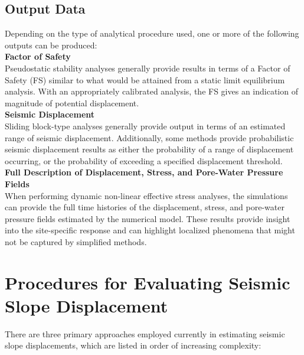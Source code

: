 \subsection{Output Data}
\label{subsec:eq_landslide_output}
Depending on the type of analytical procedure used, one or more of the following outputs can be produced:\\[0.5em]

\noindent\textbf{Factor of Safety}\\
Pseudostatic stability analyses generally provide results in terms of a Factor of Safety (FS) similar to what would be attained from a static limit equilibrium analysis. With an appropriately calibrated analysis, the FS gives an indication of magnitude of potential displacement.\\

\noindent\textbf{Seismic Displacement}\\
Sliding block-type analyses generally provide output in terms of an estimated range of seismic displacement. Additionally, some methods provide probabilistic seismic displacement results as either the probability of a range of displacement occurring, or the probability of exceeding a specified displacement threshold.\\

\noindent\textbf{Full Description of Displacement, Stress, and Pore-Water Pressure Fields}\\
When performing dynamic non-linear effective stress analyses, the simulations can provide the full time histories of the displacement, stress, and pore-water pressure fields estimated by the numerical model. These results provide insight into the site-specific response and can highlight localized phenomena that might not be captured by simplified methods.

\section{Procedures for Evaluating Seismic Slope Displacement}
\label{sec:eq_landslide_methods}

There are three primary approaches employed currently in estimating seismic slope displacements, which are listed in order of increasing complexity:
\newline

